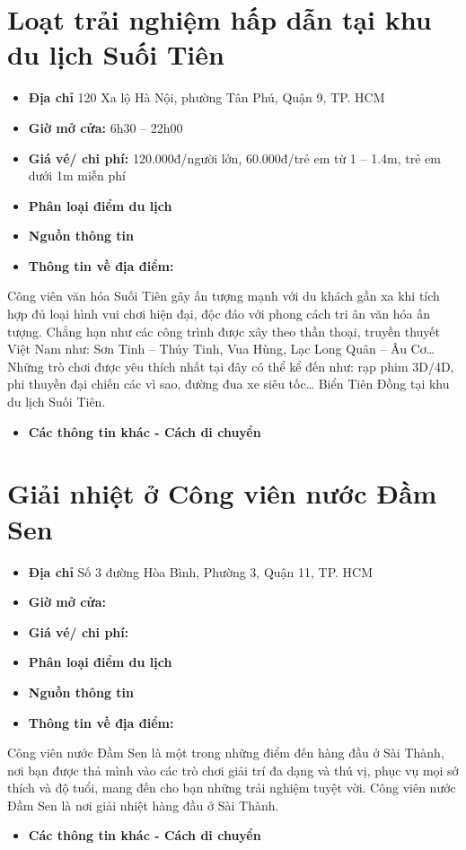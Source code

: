 \documentclass{article}
\begin{document}
\section{Loạt trải nghiệm hấp dẫn tại khu du lịch Suối Tiên}
\begin{itemize}
    \item{\textbf{Địa chỉ}} 120 Xa lộ Hà Nội, phường Tân Phú, Quận 9, TP. HCM
    \item{\textbf{Giờ mở cửa:}} 6h30 – 22h00
    \item{\textbf{Giá vé/ chi phí:}} 120.000đ/người lớn, 60.000đ/trẻ em từ 1 – 1.4m, trẻ em dưới 1m miễn phí
    \item{\textbf{Phân loại điểm du lịch} }
    \item{\textbf{Nguồn thông tin}}
    \item{\textbf{Thông tin về địa điểm:}}
\end{itemize}
Công viên văn hóa Suối Tiên gây ấn tượng mạnh với du khách gần xa khi tích hợp đủ loại hình vui chơi hiện đại, độc đáo với phong cách tri ân văn hóa ấn tượng. Chẳng hạn như các công trình được xây theo thần thoại, truyền thuyết Việt Nam như: Sơn Tinh – Thủy Tinh, Vua Hùng, Lạc Long Quân – Âu Cơ… Những trò chơi được yêu thích nhất tại đây có thể kể đến như: rạp phim 3D/4D, phi thuyền đại chiến các vì sao, đường đua xe siêu tốc… Biển Tiên Đồng tại khu du lịch Suối Tiên.
\begin{itemize}
    \item{\textbf{Các thông tin khác - Cách di chuyển}}
\end{itemize}

\section{Giải nhiệt ở Công viên nước Đầm Sen}
\begin{itemize}
    \item{\textbf{Địa chỉ}} Số 3 đường Hòa Bình, Phường 3, Quận 11, TP. HCM
    \item{\textbf{Giờ mở cửa:}}
    \item{\textbf{Giá vé/ chi phí:}}
    \item{\textbf{Phân loại điểm du lịch} }
    \item{\textbf{Nguồn thông tin}}
    \item{\textbf{Thông tin về địa điểm:}}
\end{itemize}
Công viên nước Đầm Sen là một trong những điểm đến hàng đầu ở Sài Thành, nơi bạn được thả mình vào các trò chơi giải trí đa dạng và thú vị, phục vụ mọi sở thích và độ tuổi, mang đến cho bạn những trải nghiệm tuyệt vời. Công viên nước Đầm Sen là nơi giải nhiệt hàng đầu ở Sài Thành.
\begin{itemize}
    \item{\textbf{Các thông tin khác - Cách di chuyển}}
\end{itemize}
\end{document}
